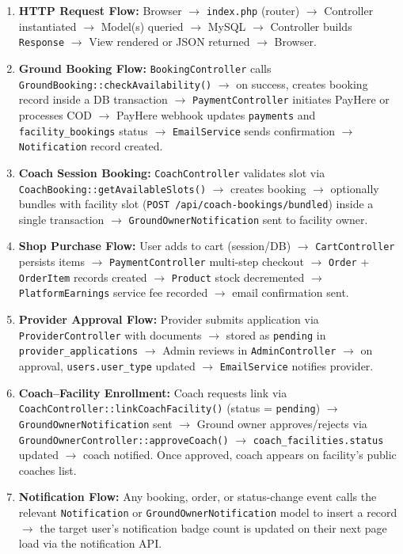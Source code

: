 \documentclass[12pt,a4paper]{report}
\begin{document}
\begin{enumerate}[leftmargin=1.5cm]
  \item \textbf{HTTP Request Flow:} Browser $\to$ \texttt{index.php} (router) $\to$ Controller instantiated $\to$ Model(s) queried $\to$ MySQL $\to$ Controller builds \texttt{Response} $\to$ View rendered or JSON returned $\to$ Browser.

  \item \textbf{Ground Booking Flow:} \texttt{BookingController} calls \texttt{GroundBooking::checkAvailability()} $\to$ on success, creates booking record inside a DB transaction $\to$ \texttt{PaymentController} initiates PayHere or processes COD $\to$ PayHere webhook updates \texttt{payments} and \texttt{facility\_bookings} status $\to$ \texttt{EmailService} sends confirmation $\to$ \texttt{Notification} record created.

  \item \textbf{Coach Session Booking:} \texttt{CoachController} validates slot via \texttt{CoachBooking::getAvailableSlots()} $\to$ creates booking $\to$ optionally bundles with facility slot (\texttt{POST /api/coach-bookings/bundled}) inside a single transaction $\to$ \texttt{GroundOwnerNotification} sent to facility owner.

  \item \textbf{Shop Purchase Flow:} User adds to cart (session/DB) $\to$ \texttt{CartController} persists items $\to$ \texttt{PaymentController} multi-step checkout $\to$ \texttt{Order} + \texttt{OrderItem} records created $\to$ \texttt{Product} stock decremented $\to$ \texttt{PlatformEarnings} service fee recorded $\to$ email confirmation sent.

  \item \textbf{Provider Approval Flow:} Provider submits application via \texttt{ProviderController} with documents $\to$ stored as \texttt{pending} in \texttt{provider\_applications} $\to$ Admin reviews in \texttt{AdminController} $\to$ on approval, \texttt{users.user\_type} updated $\to$ \texttt{EmailService} notifies provider.

  \item \textbf{Coach--Facility Enrollment:} Coach requests link via \texttt{CoachController::linkCoachFacility()} (status = \texttt{pending}) $\to$ \texttt{GroundOwnerNotification} sent $\to$ Ground owner approves/rejects via \texttt{GroundOwnerController::approveCoach()} $\to$ \texttt{coach\_facilities.status} updated $\to$ coach notified. Once approved, coach appears on facility's public coaches list.

  \item \textbf{Notification Flow:} Any booking, order, or status-change event calls the relevant \texttt{Notification} or \texttt{GroundOwnerNotification} model to insert a record $\to$ the target user's notification badge count is updated on their next page load via the notification API.
\end{enumerate}
\end{document}
